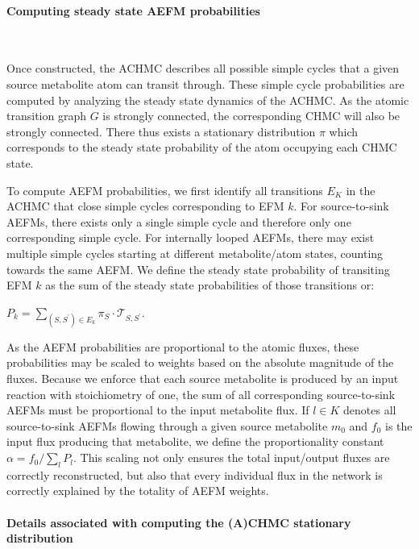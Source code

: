 \documentclass[12pt]{article}
\begin{document}
\paragraph*{Computing steady state AEFM probabilities}

\hspace*{0.1cm}\\\noindent

Once constructed, the ACHMC describes all possible simple cycles that
a given source metabolite atom can transit through. These simple cycle
probabilities are computed by analyzing the steady state dynamics of the
ACHMC. As the atomic transition graph $G$ is strongly connected, the
corresponding CHMC will also be strongly connected. There thus exists
a stationary distribution $\pi$ which corresponds to the steady state
probability of the atom occupying each CHMC state.

To compute AEFM probabilities, we first identify all transitions $E_K$ in
the ACHMC that close simple cycles corresponding to EFM $k$. For
source-to-sink AEFMs, there exists only a single simple cycle and
therefore only one corresponding simple cycle. For internally looped
AEFMs, there may exist multiple simple cycles starting at different
metabolite/atom states, counting towards the same AEFM. We define the
steady state probability of transiting EFM $k$  as the sum of the steady
state probabilities of those transitions or:

$P_k = \sum_{(S,S^{\prime}) \in E_k} \pi_S \cdot
\mathcal{T}_{S,S^{\prime}}$.

\noindent As the AEFM probabilities are proportional to the atomic fluxes,
these probabilities may be scaled to weights based on the absolute
magnitude of the fluxes. Because we enforce that each source metabolite is
produced by an input reaction with stoichiometry of one, the sum of all
corresponding source-to-sink AEFMs must be proportional to the input
metabolite flux. If $l \in K$ denotes all source-to-sink AEFMs
flowing through a given source metabolite $m_0$ and $f_0$ is the input
flux producing that metabolite, we define the proportionality constant
$\alpha = f_0 / \sum_l P_l$. This scaling not only ensures the total
input/output fluxes are correctly reconstructed, but also that every
individual flux in the network is correctly explained by the totality of
AEFM weights.

\paragraph*{Details associated with computing the (A)CHMC stationary distribution}
\end{document}

